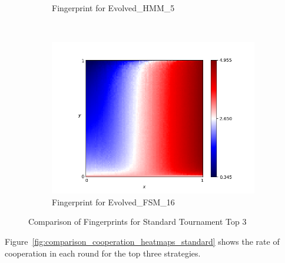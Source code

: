 \documentclass{article}
\begin{document}
\begin{figure}[!hbtp]
\begin{subfigure}[t]{.3\textwidth}
        \caption{Fingerprint for Evolved\_HMM\_5}
    \end{subfigure}%
    ~
    \begin{subfigure}[t]{.3\textwidth}
        \centering
        \includegraphics[width=\textwidth]{./assets/Evolved_FSM_16.png}
        \caption{Fingerprint for Evolved\_FSM\_16}
    \end{subfigure}%

    \caption{Comparison of Fingerprints for Standard Tournament Top 3}
    \label{fig:comparison_fingerprint_standard}
\end{figure}

Figure~\ref{fig:comparison_cooperation_heatmaps_standard} shows the rate of
cooperation in each round for the top three strategies.
\end{document}
